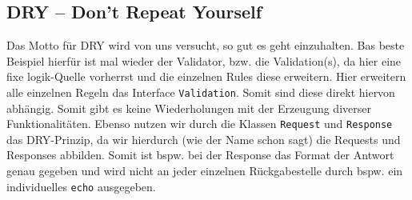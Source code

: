 \documentclass[12pt,a4paper,titlepage,ngerman,pdftex]{report}
\begin{document}
    \subsection{DRY -- Don't Repeat Yourself}
    \label{subsec:dry}
    Das Motto für DRY wird von uns versucht, so gut es geht einzuhalten.
    Bas beste Beispiel hierfür ist mal wieder der Validator, bzw. die Validation(s), da hier eine fixe logik-Quelle vorherrst und die einzelnen Rules diese erweitern.
    Hier erweitern alle einzelnen Regeln das Interface \verb|Validation|.
    Somit sind diese direkt hiervon abhängig.
    Somit gibt es keine Wiederholungen mit der Erzeugung diverser Funktionalitäten.
    Ebenso nutzen wir durch die Klassen \verb|Request| und \verb|Response| das DRY-Prinzip, da wir hierdurch (wie der Name schon sagt) die Requests und Responses abbilden.
    Somit ist bspw. bei der Response das Format der Antwort genau gegeben und wird nicht an jeder einzelnen Rückgabestelle durch bspw. ein individuelles \verb|echo| ausgegeben.
\end{document}
